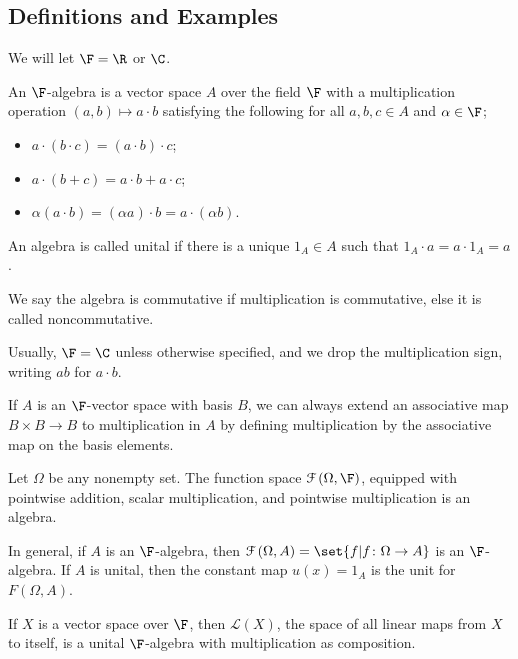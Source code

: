 \documentclass[10pt]{mypackage}
\begin{document}
\subsection{Definitions and Examples}%
We will let $\F = \R$ or $\C$.
\begin{definition}
  An $\F$-algebra is a vector space $A$ over the field $\F$ with a multiplication operation $\left(a,b\right)\mapsto a \cdot b$ satisfying the following for all $a,b,c\in A$ and $\alpha \in \F$;
  \begin{itemize}
    \item $a\cdot \left(b\cdot c\right) = \left(a\cdot b\right)\cdot c$;
    \item $a\cdot \left(b+c\right) = a\cdot b + a\cdot c$;
    \item $\alpha \left(a\cdot b\right) = \left(\alpha a\right)\cdot b = a\cdot \left(\alpha b\right)$.
  \end{itemize}
  An algebra is called unital if there is a unique $1_A\in A$ such that $1_A\cdot a = a\cdot 1_A = a$.\newline

  We say the algebra is commutative if multiplication is commutative, else it is called noncommutative.
\end{definition}
\begin{remark}
  Usually, $\F = \C$ unless otherwise specified, and we drop the multiplication sign, writing $ab$ for $a\cdot b$.
\end{remark}
\begin{remark}
  If $A$ is an $\F$-vector space with basis $B$, we can always extend an associative map $B\times B\rightarrow B$ to multiplication in $A$ by defining multiplication by the associative map on the basis elements.
\end{remark}
\begin{example}[Functions]
  Let $\Omega$ be any nonempty set. The function space $\mathcal{F}\left(\Omega,\F\right)$, equipped with pointwise addition, scalar multiplication, and pointwise multiplication is an algebra.\newline

  In general, if $A$ is an $\F$-algebra, then $\mathcal{F}\left(\Omega,A\right)= \set{f| f\colon \Omega\rightarrow A}$ is an $\F$-algebra. If $A$ is unital, then the constant map $u(x) = 1_A$ is the unit for $F\left(\Omega,A\right)$.
\end{example}
\begin{example}
  If $X$ is a vector space over $\F$, then $\mathcal{L}\left(X\right)$, the space of all linear maps from $X$ to itself, is a unital $\F$-algebra with multiplication as composition.
\end{example}
\end{document}
